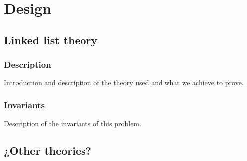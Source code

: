 \chapter{Design\label{chap:design}}

\section{Linked list theory}

\subsection{Description}

Introduction and description of the theory used and what we achieve to prove.

\subsection{Invariants}

Description of the invariants of this problem.




\section{¿Other theories?}
